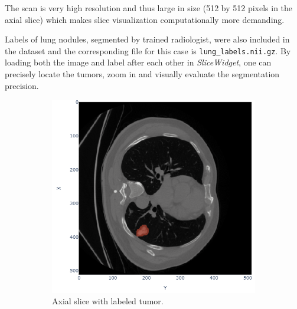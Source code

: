 The scan is very high resolution and thus large in size (512 by 512 pixels in the axial slice) which makes slice visualization computationally more demanding.

Labels of lung nodules, segmented by trained radiologist, were also included in the dataset and the corresponding file for this case is \texttt{lung\_labels.nii.gz}. By loading both the image and label after each other in \emph{SliceWidget}, one can precisely locate the tumors, zoom in and visually evaluate the segmentation precision.

\begin{figure}[h]
	\centering
	\begin{subfigure}[t]{0.45\linewidth}
		\centering
		\includegraphics[width=\linewidth]{figures/lung_label.png}
		\caption{Axial slice with labeled tumor.}
	\end{subfigure}
	\hfill
	\begin{subfigure}[t]{0.45\linewidth}
		\centering

\end{subfigure}
\end{figure}
